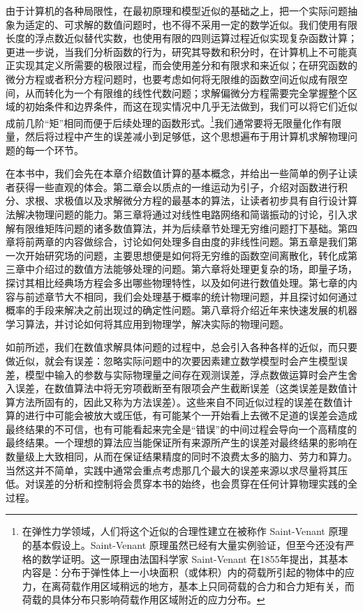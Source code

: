 由于计算机的各种局限性，在最初原理和模型近似的基础之上，把一个实际问题抽象为适定的、可求解的数值问题时，也不得不采用一定的数学近似。我们使用有限长度的浮点数近似替代实数，也使用有限的四则运算过程近似实现复杂函数计算；更进一步说，当我们分析函数的行为，研究其导数和积分时，在计算机上不可能真正实现其定义所需要的极限过程，而会使用差分和有限求和来近似；在研究函数的微分方程或者积分方程问题时，也要考虑如何将无限维的函数空间近似成有限空间，从而转化为一个有限维的线性代数问题；求解偏微分方程需要完全掌握整个区域的初始条件和边界条件，而这在现实情况中几乎无法做到，我们可以将它们近似成前几阶“矩”相同而便于后续处理的函数形式。\footnote{在弹性力学领域，人们将这个近似的合理性建立在被称作 Saint-Venant 原理的基本假设上。Saint-Venant 原理虽然已经有大量实例验证，但至今还没有严格的数学证明。这一原理由法国科学家 Saint-Venant 在1855年提出，其基本内容是：分布于弹性体上一小块面积（或体积）内的荷载所引起的物体中的应力，在离荷载作用区域稍远的地方，基本上只同荷载的合力和合力矩有关，而荷载的具体分布只影响荷载作用区域附近的应力分布。}我们通常要将无限量化作有限量，然后将过程中产生的误差减小到足够低，这个思想遍布于用计算机求解物理问题的每一个环节。

在本书中，我们会先在本章介绍数值计算的基本概念，并给出一些简单的例子让读者获得一些直观的体会。第二章会以质点的一维运动为引子，介绍对函数进行积分、求根、求极值以及求解微分方程的最基本的算法，让读者初步具有自行设计算法解决物理问题的能力。第三章将通过对线性电路网络和简谐振动的讨论，引入求解有限维矩阵问题的诸多数值算法，并为后续章节处理无穷维问题打下基础。第四章将前两章的内容做综合，讨论如何处理多自由度的非线性问题。第五章是我们第一次开始研究场的问题，主要思想便是如何将无穷维的函数空间离散化，转化成第三章中介绍过的数值方法能够处理的问题。第六章将处理更复杂的场，即量子场，探讨其相比经典场方程会多出哪些物理特性，以及如何进行数值处理。第七章的内容与前述章节大不相同，我们会处理基于概率的统计物理问题，并且探讨如何通过概率的手段来解决之前出现过的确定性问题。第八章将介绍近年来快速发展的机器学习算法，并讨论如何将其应用到物理学，解决实际的物理问题。

如前所述，我们在数值求解具体问题的过程中，总会引入各种各样的近似，而只要做近似，就会有误差：忽略实际问题中的次要因素建立数学模型时会产生模型误差，模型中输入的参数与实际物理量之间存在观测误差，浮点数做运算时会产生舍入误差，在数值算法中将无穷项截断至有限项会产生截断误差（这类误差是数值计算方法所固有的，因此又称为方法误差）。这些来自不同近似过程的误差在数值计算的进行中可能会被放大或压低，有可能某个一开始看上去微不足道的误差会造成最终结果的不可信，也有可能看起来完全是“错误”的中间过程会导向一个高精度的最终结果。一个理想的算法应当能保证所有来源所产生的误差对最终结果的影响在数量级上大致相同，从而在保证结果精度的同时不浪费太多的脑力、劳力和算力。当然这并不简单，实践中通常会重点考虑那几个最大的误差来源以求尽量将其压低。对误差的分析和控制将会贯穿本书的始终，也会贯穿在任何计算物理实践的全过程。

